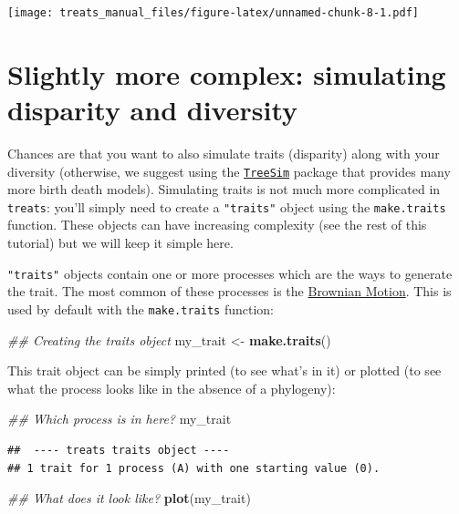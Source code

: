 \documentclass[
]{book}
\newenvironment{Shaded}{\begin{snugshade}}{\end{snugshade}}
\newcommand{\CommentTok}[1]{\textcolor[rgb]{0.56,0.35,0.01}{\textit{#1}}}
\newcommand{\KeywordTok}[1]{\textcolor[rgb]{0.13,0.29,0.53}{\textbf{#1}}}
\newcommand{\NormalTok}[1]{#1}
\newcommand{\StringTok}[1]{\textcolor[rgb]{0.31,0.60,0.02}{#1}}
\begin{document}
\texttt{[image: treats\_manual\_files/figure-latex/unnamed-chunk-8-1.pdf]}

\hypertarget{slightly-more-complex-simulating-disparity-and-diversity}{%
\section{Slightly more complex: simulating disparity and diversity}\label{slightly-more-complex-simulating-disparity-and-diversity}}

Chances are that you want to also simulate traits (disparity) along with your diversity (otherwise, we suggest using the \href{https://github.com/tanja819/TreeSim/}{\texttt{TreeSim}} package that provides many more birth death models).
Simulating traits is not much more complicated in \texttt{treats}: you'll simply need to create a \texttt{"traits"} object using the \texttt{make.traits} function.
These objects can have increasing complexity (see the rest of this tutorial) but we will keep it simple here.

\texttt{"traits"} objects contain one or more processes which are the ways to generate the trait.
The most common of these processes is the \href{https://en.wikipedia.org/wiki/Brownian_motion}{Brownian Motion}.
This is used by default with the \texttt{make.traits} function:

\begin{Shaded}
\begin{Highlighting}[]
\CommentTok{\#\# Creating the traits object}
\NormalTok{my\_trait \textless{}{-}}\StringTok{ }\KeywordTok{make.traits}\NormalTok{()}
\end{Highlighting}
\end{Shaded}

This trait object can be simply printed (to see what's in it) or plotted (to see what the process looks like in the absence of a phylogeny):

\begin{Shaded}
\begin{Highlighting}[]
\CommentTok{\#\# Which process is in here?}
\NormalTok{my\_trait}
\end{Highlighting}
\end{Shaded}

\begin{verbatim}
##  ---- treats traits object ---- 
## 1 trait for 1 process (A) with one starting value (0).
\end{verbatim}

\begin{Shaded}
\begin{Highlighting}[]
\CommentTok{\#\# What does it look like?}
\KeywordTok{plot}\NormalTok{(my\_trait)}
\end{Highlighting}
\end{Shaded}
\end{document}
